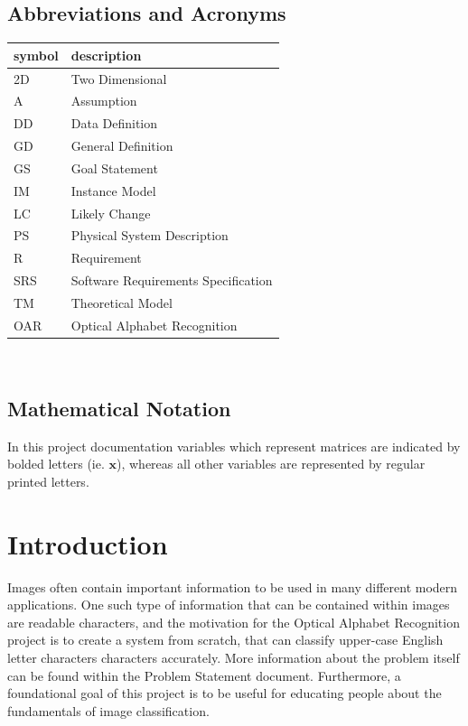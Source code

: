 \documentclass[12pt]{article}
\begin{document}
\subsection{Abbreviations and Acronyms}

\renewcommand{\arraystretch}{1.2}
\begin{tabular}{l l} 
  \toprule		
  \textbf{symbol} & \textbf{description}\\
  \midrule 
  2D & Two Dimensional\\
  A & Assumption\\
  DD & Data Definition\\
  GD & General Definition\\
  GS & Goal Statement\\
  IM & Instance Model\\
  LC & Likely Change\\
  PS & Physical System Description\\
  R & Requirement\\
  SRS & Software Requirements Specification\\
  TM & Theoretical Model\\
  OAR & Optical Alphabet Recognition\\
  \bottomrule
\end{tabular}\\

\subsection{Mathematical Notation}

In this project documentation variables which represent matrices are indicated by bolded letters (ie. $\mathbf{x}$), whereas
all other variables are represented by regular printed letters.


\newpage


\section{Introduction}

Images often contain important information to be used in many different modern applications. One such type 
of information that can be contained within images are readable characters, and the motivation for the Optical Alphabet 
Recognition project is to create a system from scratch, that can classify upper-case English letter characters characters accurately.
More information about the problem itself can be found within the Problem Statement document. Furthermore, a foundational goal of
this project is to be useful for educating people about the fundamentals of image classification.
\end{document}
